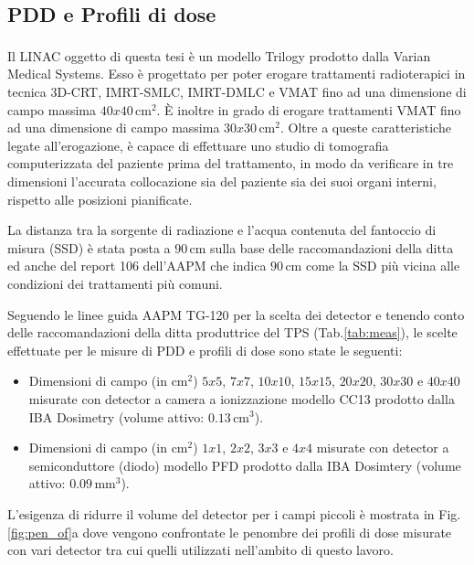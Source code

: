 \subsection{PDD e Profili di dose}
Il LINAC oggetto di questa tesi è un modello Trilogy\textsuperscript{\textcopyright} prodotto dalla Varian Medical Systems. Esso è progettato per poter erogare trattamenti radioterapici in tecnica 3D-CRT, IMRT-SMLC, IMRT-DMLC e VMAT fino ad una dimensione di campo massima $40x40\,$cm$^2$. \`E inoltre in grado di erogare trattamenti VMAT fino ad una dimensione di campo massima $30x30\,$cm$^2$. Oltre a queste caratteristiche legate all'erogazione, è capace di effettuare uno studio di tomografia computerizzata del paziente prima del trattamento, in modo da verificare in tre dimensioni l'accurata collocazione sia del paziente sia dei suoi organi interni, rispetto alle posizioni pianificate.

La distanza tra la sorgente di radiazione e l'acqua contenuta del fantoccio di misura (SSD) è stata posta a $90\,$cm sulla base delle raccomandazioni della ditta ed anche del report 106 dell'AAPM \cite{Das2008a} che indica $90\,$cm come la SSD più vicina alle condizioni dei trattamenti più comuni.

Seguendo le linee guida AAPM TG-120 per la scelta dei detector \cite{Low2011} e tenendo conto delle raccomandazioni della ditta produttrice del TPS (Tab.\ref{tab:meas}), le scelte effettuate per le misure di PDD e profili di dose sono state le seguenti:
\begin{itemize}
\item Dimensioni di campo (in cm$^2$) $5x5$, $7x7$, $10x10$, $15x15$, $20x20$, $30x30$ e $40x40$ misurate con detector a camera a ionizzazione modello CC13 prodotto dalla IBA Dosimetry (volume attivo: $0.13\,$cm$^3$).
\item Dimensioni di campo (in cm$^2$) $1x1$, $2x2$, $3x3$ e $4x4$ misurate con detector a semiconduttore (diodo) modello PFD prodotto dalla IBA Dosimtery (volume attivo: $0.09\,$mm$^3$).
\end{itemize}
L'esigenza di ridurre il volume del detector per i campi piccoli è mostrata in Fig.\ref{fig:pen_of}a dove vengono confrontate le penombre dei profili di dose misurate con vari detector tra cui quelli utilizzati nell'ambito di questo lavoro.

